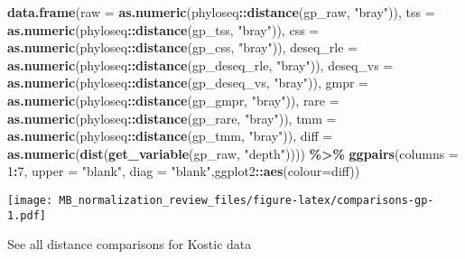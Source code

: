\documentclass[
]{book}
\newenvironment{Shaded}{\begin{snugshade}}{\end{snugshade}}
\newcommand{\DataTypeTok}[1]{\textcolor[rgb]{0.13,0.29,0.53}{#1}}
\newcommand{\DecValTok}[1]{\textcolor[rgb]{0.00,0.00,0.81}{#1}}
\newcommand{\KeywordTok}[1]{\textcolor[rgb]{0.13,0.29,0.53}{\textbf{#1}}}
\newcommand{\NormalTok}[1]{#1}
\newcommand{\OperatorTok}[1]{\textcolor[rgb]{0.81,0.36,0.00}{\textbf{#1}}}
\newcommand{\StringTok}[1]{\textcolor[rgb]{0.31,0.60,0.02}{#1}}
\begin{document}
\begin{Shaded}
\begin{Highlighting}[]
\KeywordTok{data.frame}\NormalTok{(}\DataTypeTok{raw =} \KeywordTok{as.numeric}\NormalTok{(phyloseq}\OperatorTok{::}\KeywordTok{distance}\NormalTok{(gp\_raw, }\StringTok{"bray"}\NormalTok{)), }
           \DataTypeTok{tss =} \KeywordTok{as.numeric}\NormalTok{(phyloseq}\OperatorTok{::}\KeywordTok{distance}\NormalTok{(gp\_tss, }\StringTok{"bray"}\NormalTok{)), }
           \DataTypeTok{css =} \KeywordTok{as.numeric}\NormalTok{(phyloseq}\OperatorTok{::}\KeywordTok{distance}\NormalTok{(gp\_css, }\StringTok{"bray"}\NormalTok{)),}
           \DataTypeTok{deseq\_rle =} \KeywordTok{as.numeric}\NormalTok{(phyloseq}\OperatorTok{::}\KeywordTok{distance}\NormalTok{(gp\_deseq\_rle, }\StringTok{"bray"}\NormalTok{)),}
           \DataTypeTok{deseq\_vs =} \KeywordTok{as.numeric}\NormalTok{(phyloseq}\OperatorTok{::}\KeywordTok{distance}\NormalTok{(gp\_deseq\_vs, }\StringTok{"bray"}\NormalTok{)),}
           \DataTypeTok{gmpr =} \KeywordTok{as.numeric}\NormalTok{(phyloseq}\OperatorTok{::}\KeywordTok{distance}\NormalTok{(gp\_gmpr, }\StringTok{"bray"}\NormalTok{)),}
           \DataTypeTok{rare =} \KeywordTok{as.numeric}\NormalTok{(phyloseq}\OperatorTok{::}\KeywordTok{distance}\NormalTok{(gp\_rare, }\StringTok{"bray"}\NormalTok{)),}
           \DataTypeTok{tmm =} \KeywordTok{as.numeric}\NormalTok{(phyloseq}\OperatorTok{::}\KeywordTok{distance}\NormalTok{(gp\_tmm, }\StringTok{"bray"}\NormalTok{)),}
           \DataTypeTok{diff =} \KeywordTok{as.numeric}\NormalTok{(}\KeywordTok{dist}\NormalTok{(}\KeywordTok{get\_variable}\NormalTok{(gp\_raw, }\StringTok{"depth"}\NormalTok{)))) }\OperatorTok{\%\textgreater{}\%}\StringTok{ }
\StringTok{    }\KeywordTok{ggpairs}\NormalTok{(}\DataTypeTok{columns =} \DecValTok{1}\OperatorTok{:}\DecValTok{7}\NormalTok{, }\DataTypeTok{upper =} \StringTok{"blank"}\NormalTok{,}
            \DataTypeTok{diag =} \StringTok{"blank"}\NormalTok{,ggplot2}\OperatorTok{::}\KeywordTok{aes}\NormalTok{(}\DataTypeTok{colour=}\NormalTok{diff))}
\end{Highlighting}
\end{Shaded}

\texttt{[image: MB\_normalization\_review\_files/figure-latex/comparisons-gp-1.pdf]}

See all distance comparisons for Kostic data
\end{document}
